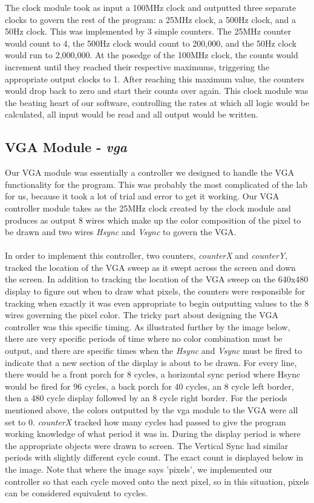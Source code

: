 \documentclass{article}
\begin{document}
The clock module took as input a 100MHz clock and outputted three separate clocks to govern the rest of the program: a 25MHz clock, a 500Hz clock, and a 50Hz clock.  This was implemented by 3 simple counters. The 25MHz counter would count to 4, the 500Hz clock would count to 200,000, and the 50Hz clock would run to 2,000,000.  At the posedge of the 100MHz clock, the counts would increment until they reached their respective maximums, triggering the appropriate output clocks to 1. After reaching this maximum value, the counters would drop back to zero and start their counts over again.  This clock module was the beating heart of our software, controlling the rates at which all logic would be calculated, all input would be read and all output would be written.

\subsection*{VGA Module - \textit{vga}}

Our VGA module was essentially a controller we designed to handle the VGA functionality for the program.  This was probably the most complicated of the lab for us, because it took a lot of trial and error to get it working.  Our VGA controller module takes as the 25MHz clock created by the clock module and produces as output 8 wires which make up the color composition of the pixel to be drawn and two wires \textit{Hsync} and \textit{Vsync} to govern the VGA.  \\
\\
In order to implement this controller, two counters, \textit{counterX} and \textit{counterY}, tracked the location of the VGA sweep as it swept across the screen and down the screen.  In addition to tracking the location of the VGA sweep on the 640x480 display to figure out when to draw what pixels, the counters were responsible for tracking when exactly it was even appropriate to begin outputting values to the 8 wires governing the pixel color. The tricky part about designing the VGA controller was this specific timing.  As illustrated further by the image below, there are very specific periods of time where no color combination must be output, and there are specific times when the \textit{Hsync} and \textit{Vsync} must be fired to indicate that a new section of the display is about to be drawn.  For every line, there would be a front porch for 8 cycles, a horizontal sync period where Hsync would be fired for 96 cycles, a back porch for 40 cycles, an 8 cycle left border, then a 480 cycle display followed by an 8 cycle right border.  For the periods mentioned above, the colors outputted by the vga module to the VGA were all set to 0.  \textit{counterX} tracked how many cycles had passed to give the program working knowledge of what period it was in. During the display period is where the appropriate objects were drawn to screen.  The Vertical Sync had similar periods with slightly different cycle count.  The exact count is displayed below in the image.  Note that where the image says 'pixels', we implemented our controller so that each cycle moved onto the next pixel, so in this situation, pixels can be considered equivalent to cycles.
\end{document}
